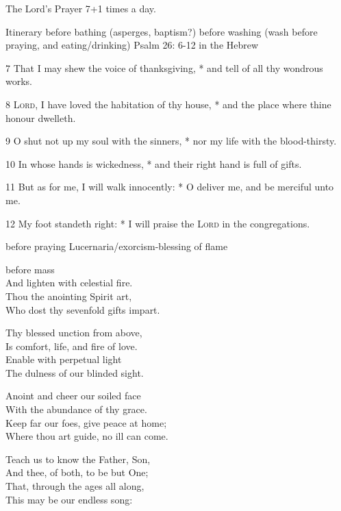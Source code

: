  

The Lord's Prayer 7+1 times a day.


Itinerary
before bathing (asperges, baptism?)
before washing (wash before praying, and eating/drinking)
Psalm 26: 6-12 in the Hebrew

7 That I may shew the voice of thanksgiving, * and tell of all thy wondrous works.

8 {\scshape Lord}, I have loved the habitation of thy house, * and the place where thine honour dwelleth.

9 O shut not up my soul with the sinners, * nor my life with the blood-thirsty.

10 In whose hands is wickedness, * and their right hand is full of gifts.

11 But as for me, I will walk innocently: * O deliver me, and be merciful unto me.

12 My foot standeth right: * I will praise the {\scshape Lord} in the congregations.

before praying
Lucernaria/exorcism-blessing of flame

before mass
\\
And lighten with celestial fire.\\
Thou the anointing Spirit art,\\
Who dost thy sevenfold gifts impart.

Thy blessed unction from above,\\
Is comfort, life, and fire of love.\\
Enable with perpetual light\\
The dulness of our blinded sight.

Anoint and cheer our soiled face\\
With the abundance of thy grace.\\
Keep far our foes, give peace at home;\\
Where thou art guide, no ill can come.

Teach us to know the Father, Son,\\
And thee, of both, to be but One;\\
That, through the ages all along,\\
This may be our endless song:

